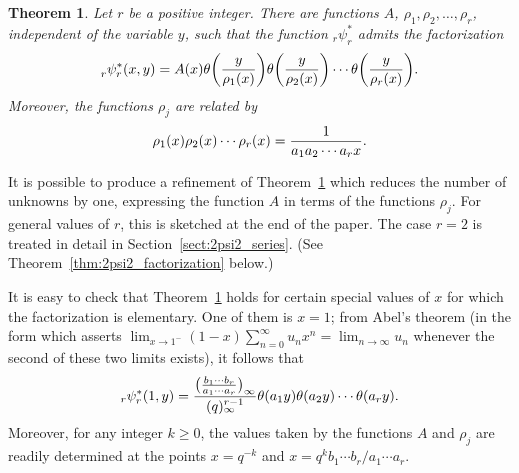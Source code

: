 \documentclass[10pt,a4paper]{amsart}
\numberwithin{equation}{section}
\newtheorem{Theorem}{Theorem}[section]
\begin{document}
\begin{Theorem} \label{thm:general_rpsir_factorization}
Let $r$ be a positive integer. There are functions $A$, $\rho_1, \rho_2, \dots, \rho_r$, independent of the variable $y$, such that the function $_r^{}\psi_r^\ast$ admits the factorization
\begin{equation} \label{eqn:general_rpsir_factorization}
_r^{}\psi_r^\ast(x,y) = A(x) \theta\bigg( {y \over \rho_1(x)} \bigg) \theta\bigg( {y \over \rho_2(x)} \bigg) \cdots \theta\bigg( {y \over \rho_r(x)} \bigg).
\end{equation}
Moreover, the functions $\rho_j$ are related by
\begin{equation} \label{eqn:rho_product}
\rho_1(x) \rho_2(x) \cdots \rho_r(x) = {1 \over a_1 a_2 \cdots a_r x}.
\end{equation}
\end{Theorem}

It is possible to produce a refinement of Theorem~\ref{thm:general_rpsir_factorization} which reduces the number of unknowns by one, expressing the function $A$ in terms of the functions $\rho_j$. For general values of $r$, this is sketched at the end of the paper. The case $r=2$ is treated in detail in Section~\ref{sect:2psi2_series}. (See Theorem~\ref{thm:2psi2_factorization} below.)

It is easy to check that Theorem~\ref{thm:general_rpsir_factorization} holds for certain special values of $x$ for which the factorization is elementary. One of them is $x=1$; from Abel's theorem \big(in the form which asserts $\lim_{x \rightarrow 1^-} (1-x)\sum_{n=0}^\infty u_n x^n = \lim_{n \rightarrow \infty} u_n$ whenever the second of these two limits exists\big), it follows that
\begin{equation} \label{eqn:rpsir_factorization_at_x=1}
_r\psi_r^\ast(1,y) = {\bigl({b_1\cdots b_r \over a_1\cdots a_r}\bigr)_\infty \over (q)_\infty^{r-1}} \theta(a_1y) \theta(a_2y) \cdots \theta(a_ry).
\end{equation}
Moreover, for any integer $k \geq 0$, the values taken by the functions $A$ and $\rho_j$ are readily determined at the points $x=q^{-k}$ and $x=q^kb_1\cdots b_r/a_1\cdots a_r$.
\end{document}
